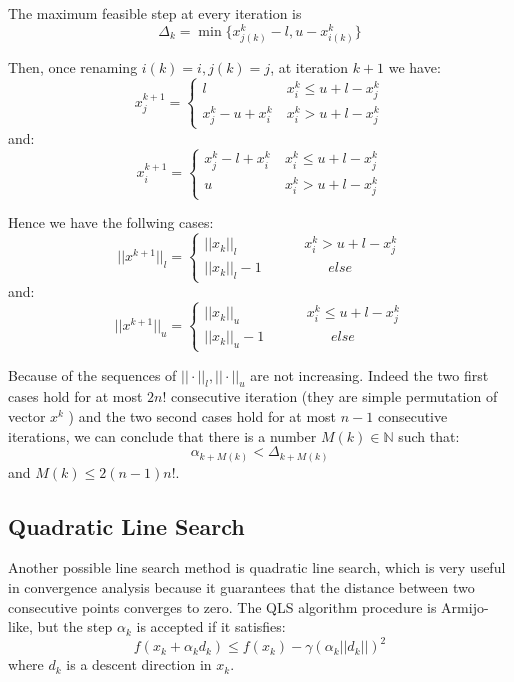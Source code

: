 The maximum feasible step at every iteration is
\begin{equation}
\Delta_k= \min \{ x^k_{j(k)}-l, u-x^k_{i(k)}\}
\end{equation}

Then, once renaming $i(k)=i,j(k)=j$, at iteration $k+1$ we have:
\begin{equation*}
x^{k+1}_{j}=\begin{cases}
 l \ &x^k_{i}\le u+l-x^k_{j}\\
 x^k_{j}-u+x^k_{i} \ &x^k_{i}> u+l-x^k_{j}
 \end{cases}
\end{equation*}
and:
\begin{equation*}
x^{k+1}_{i}=\begin{cases}
 x^k_{j}-l+x^k_{i} \ &x^k_{i}\le u+l-x^k_{j}\\
 u \ &x^k_{i}> u+l-x^k_{j}
 \end{cases}
\end{equation*}

Hence we have the follwing cases:
\begin{equation}
 ||x^{k+1}||_l=\begin{cases} ||x_{k}||_l\hspace{2cm} x^k_{i}> u+l-x^k_{j} \\
 ||x_k||_l-1\hspace{2cm} else               
              \end{cases}
\end{equation}
and:
\begin{equation}
 ||x^{k+1}||_u=\begin{cases} ||x_{k}||_u\hspace{2cm} x^k_{i}\le u+l-x^k_{j} \\
 ||x_k||_u-1\hspace{2cm} else               
              \end{cases}
\end{equation}

Because of the sequences of $||\cdot||_l, ||\cdot||_u$ are not increasing.
Indeed the two first cases hold for at most $2n!$ consecutive iteration (they are simple permutation of vector $x^k$ ) and the two second cases hold for at most $n-1$ consecutive iterations,
we can conclude that there is a number $M(k) \in \mathbb{N}$ such that:
\begin{equation}
 \alpha_{k+M(k)} < \Delta_{k+M(k)}
\end{equation}
and $M(k)\le 2(n-1)n!$.
\fi
\subsection{Quadratic Line Search}
Another possible line search method is quadratic line search, which is very useful in convergence analysis because it guarantees that the distance between two consecutive points converges to zero.
The QLS algorithm procedure is Armijo-like, but the step $\alpha_k$ is accepted if it satisfies:
\begin{equation}
f(x_k+\alpha_kd_k) \le  f(x_k)- \gamma (\alpha_k||d_k||)^2
\end{equation}
 where $d_k$ is a descent direction in $x_k$.

